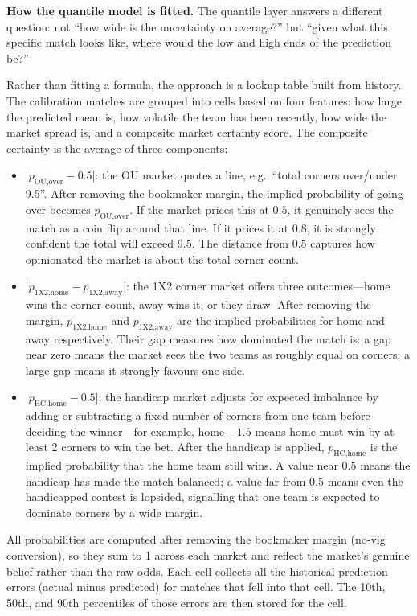 \documentclass{article}
\begin{document}
\medskip
\noindent \textbf{How the quantile model is fitted.}
The quantile layer answers a different question: not ``how wide is the uncertainty on average?'' but ``given what this specific match looks like, where would the low and high ends of the prediction be?''

Rather than fitting a formula, the approach is a lookup table built from history.
The calibration matches are grouped into cells based on four features: how large the predicted mean is, how volatile the team has been recently, how wide the market spread is, and a composite market certainty score.
The composite certainty is the average of three components:
\begin{itemize}
  \item \(\lvert p_{\text{OU,over}} - 0.5 \rvert\): the OU market quotes a line, e.g.\ ``total corners over/under 9.5''. After removing the bookmaker margin, the implied probability of going over becomes \(p_{\text{OU,over}}\). If the market prices this at \(0.5\), it genuinely sees the match as a coin flip around that line. If it prices it at \(0.8\), it is strongly confident the total will exceed 9.5. The distance from \(0.5\) captures how opinionated the market is about the total corner count.

  \item \(\lvert p_{\text{1X2,home}} - p_{\text{1X2,away}} \rvert\): the 1X2 corner market offers three outcomes---home wins the corner count, away wins it, or they draw. After removing the margin, \(p_{\text{1X2,home}}\) and \(p_{\text{1X2,away}}\) are the implied probabilities for home and away respectively. Their gap measures how dominated the match is: a gap near zero means the market sees the two teams as roughly equal on corners; a large gap means it strongly favours one side.

  \item \(\lvert p_{\text{HC,home}} - 0.5 \rvert\): the handicap market adjusts for expected imbalance by adding or subtracting a fixed number of corners from one team before deciding the winner---for example, home \(-1.5\) means home must win by at least 2 corners to win the bet. After the handicap is applied, \(p_{\text{HC,home}}\) is the implied probability that the home team still wins. A value near \(0.5\) means the handicap has made the match balanced; a value far from \(0.5\) means even the handicapped contest is lopsided, signalling that one team is expected to dominate corners by a wide margin.
\end{itemize}
All probabilities are computed after removing the bookmaker margin (no-vig conversion), so they sum to 1 across each market and reflect the market's genuine belief rather than the raw odds.
Each cell collects all the historical prediction errors (actual minus predicted) for matches that fell into that cell.
The 10th, 50th, and 90th percentiles of those errors are then stored for the cell.
\end{document}
